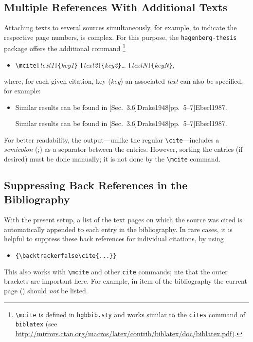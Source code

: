 \subsection{Multiple References With Additional Texts}

Attaching texts to several sources simultaneously, for example, to indicate the
respective page numbers, is complex. For this purpose, the
\texttt{hagenberg-thesis} package offers the additional command%
\footnote{\texttt{\textbackslash mcite} is defined in \texttt{hgbbib.sty} and
works similar to the \texttt{{\bs}cites} command of \texttt{biblatex}
(see \url{http://mirrors.ctan.org/macros/latex/contrib/biblatex/doc/biblatex.pdf}).}
%
\begin{itemize}
\item[]
\verb!\mcite[!\textit{text1}\verb!]{!\textit{key1}\verb!}!%
      \verb![!\textit{text2}\verb!]{!\textit{key2}\verb!}!\ldots%
			\verb![!\textit{textN}\verb!]{!\textit{keyN}\verb!}!,
\end{itemize}
%
where, for each given citation, key (\textit{key}) an associated \textit{text} can
also be specified, for example:
%
\begin{itemize}
    \item Similar results can be found in 
    [Sec.~3.6]{Drake1948}[pp.~5--7]{Eberl1987}.
\begin{LaTeXCode}[numbers=none]
Similar results can be found in 
[Sec.~3.6]{Drake1948}[pp.~5--7]{Eberl1987}.
\end{LaTeXCode}
\end{itemize}
%
For better readability, the output---unlike the regular
\texttt{\textbackslash cite}---includes a \emph{semicolon} (;) as a separator
between the entries. However, sorting the entries (if desired) must be done
manually; it is not done by the \texttt{\textbackslash mcite} command.


\subsection{Suppressing Back References in the Bibliography}

With the present setup, a list of the text pages on which the source was cited
is automatically appended to each entry in the bibliography. In rare cases, it
is helpful to suppress these back references for individual citations, by using
%
\begin{itemize}
    \item[] \verb!{\backtrackerfalse\cite{...}}!
\end{itemize}
%
This also works with \verb!\mcite! and other \verb!cite! commands; nte that 
the outer brackets are important here. For example, in item
{\backtrackerfalse\parencite{Bezos2022}} of the bibliography 
the current page (\the\value{page}) should \emph{not} be listed.

